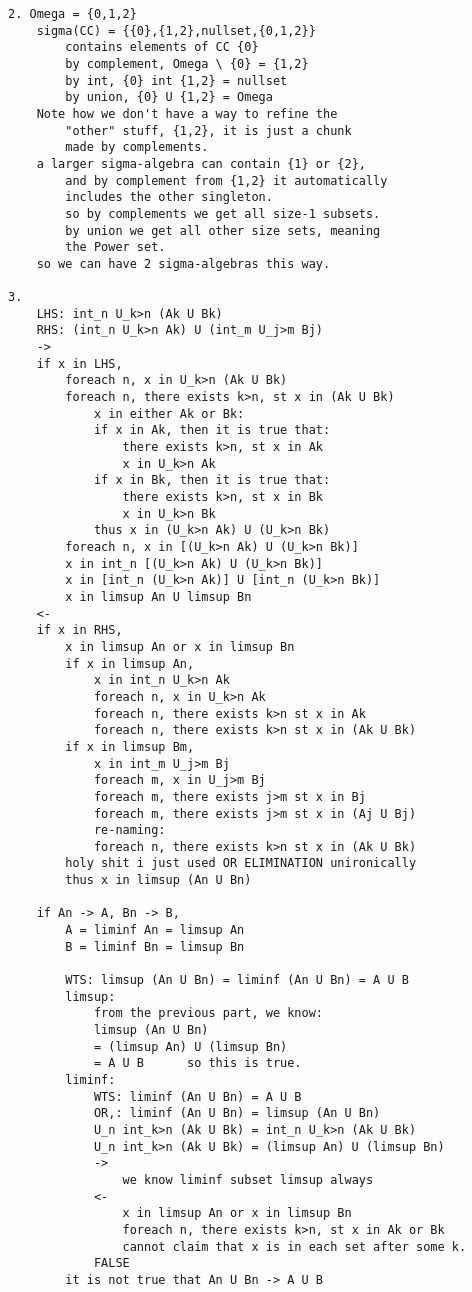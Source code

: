 \documentclass{article}
\begin{document}
\begin{flushleft}
\begin{verbatim}
2. Omega = {0,1,2}
    sigma(CC) = {{0},{1,2},nullset,{0,1,2}}
        contains elements of CC {0}
        by complement, Omega \ {0} = {1,2}
        by int, {0} int {1,2} = nullset 
        by union, {0} U {1,2} = Omega
    Note how we don't have a way to refine the 
        "other" stuff, {1,2}, it is just a chunk
        made by complements. 
    a larger sigma-algebra can contain {1} or {2},
        and by complement from {1,2} it automatically
        includes the other singleton. 
        so by complements we get all size-1 subsets.
        by union we get all other size sets, meaning 
        the Power set.
    so we can have 2 sigma-algebras this way. 

3.
    LHS: int_n U_k>n (Ak U Bk)
    RHS: (int_n U_k>n Ak) U (int_m U_j>m Bj)
    ->
    if x in LHS,
        foreach n, x in U_k>n (Ak U Bk)
        foreach n, there exists k>n, st x in (Ak U Bk)
            x in either Ak or Bk:
            if x in Ak, then it is true that:
                there exists k>n, st x in Ak
                x in U_k>n Ak
            if x in Bk, then it is true that:
                there exists k>n, st x in Bk
                x in U_k>n Bk
            thus x in (U_k>n Ak) U (U_k>n Bk)
        foreach n, x in [(U_k>n Ak) U (U_k>n Bk)]
        x in int_n [(U_k>n Ak) U (U_k>n Bk)]
        x in [int_n (U_k>n Ak)] U [int_n (U_k>n Bk)]
        x in limsup An U limsup Bn 
    <-
    if x in RHS, 
        x in limsup An or x in limsup Bn 
        if x in limsup An, 
            x in int_n U_k>n Ak 
            foreach n, x in U_k>n Ak 
            foreach n, there exists k>n st x in Ak
            foreach n, there exists k>n st x in (Ak U Bk)
        if x in limsup Bm,
            x in int_m U_j>m Bj
            foreach m, x in U_j>m Bj
            foreach m, there exists j>m st x in Bj
            foreach m, there exists j>m st x in (Aj U Bj)
            re-naming:
            foreach n, there exists k>n st x in (Ak U Bk)
        holy shit i just used OR ELIMINATION unironically
        thus x in limsup (An U Bn)

    if An -> A, Bn -> B, 
        A = liminf An = limsup An 
        B = liminf Bn = limsup Bn
        
        WTS: limsup (An U Bn) = liminf (An U Bn) = A U B
        limsup:
            from the previous part, we know: 
            limsup (An U Bn) 
            = (limsup An) U (limsup Bn) 
            = A U B      so this is true.
        liminf: 
            WTS: liminf (An U Bn) = A U B
            OR,: liminf (An U Bn) = limsup (An U Bn)
            U_n int_k>n (Ak U Bk) = int_n U_k>n (Ak U Bk)
            U_n int_k>n (Ak U Bk) = (limsup An) U (limsup Bn) 
            -> 
                we know liminf subset limsup always 
            <- 
                x in limsup An or x in limsup Bn 
                foreach n, there exists k>n, st x in Ak or Bk 
                cannot claim that x is in each set after some k.
            FALSE 
        it is not true that An U Bn -> A U B
        

\end{verbatim}
\end{flushleft}
\end{document}

